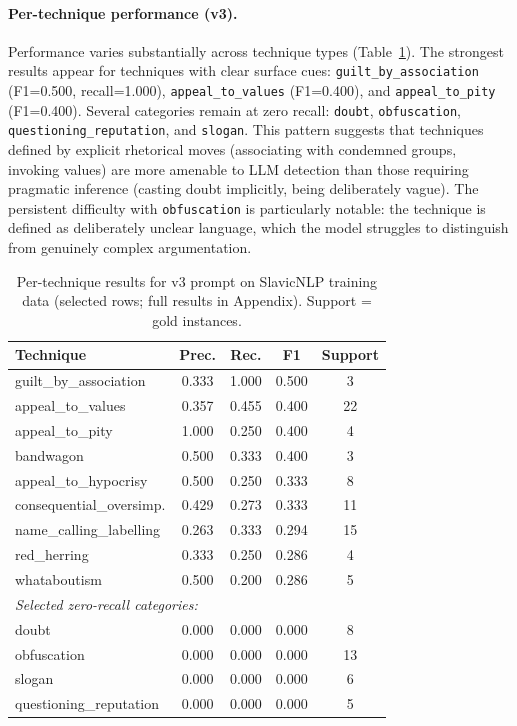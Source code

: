 \documentclass[10pt, a4paper]{article}
\begin{document}
\paragraph{Per-technique performance (v3).}
Performance varies substantially across technique types (Table~\ref{tab:per_technique}). The strongest results appear for techniques with clear surface cues: \texttt{guilt\_by\_association} (F1=0.500, recall=1.000), \texttt{appeal\_to\_values} (F1=0.400), and \texttt{appeal\_to\_pity} (F1=0.400). Several categories remain at zero recall: \texttt{doubt}, \texttt{obfuscation}, \texttt{questioning\_reputation}, and \texttt{slogan}. This pattern suggests that techniques defined by explicit rhetorical moves (associating with condemned groups, invoking values) are more amenable to LLM detection than those requiring pragmatic inference (casting doubt implicitly, being deliberately vague). The persistent difficulty with \texttt{obfuscation} is particularly notable: the technique is defined as deliberately unclear language, which the model struggles to distinguish from genuinely complex argumentation.

\begin{table}[h]
\centering
\small
\begin{tabular}{lcccc}
  \hline
  \textbf{Technique} & \textbf{Prec.} & \textbf{Rec.} & \textbf{F1} & \textbf{Support} \\
  \hline
  guilt\_by\_association & 0.333 & 1.000 & 0.500 & 3 \\
  appeal\_to\_values & 0.357 & 0.455 & 0.400 & 22 \\
  appeal\_to\_pity & 1.000 & 0.250 & 0.400 & 4 \\
  bandwagon & 0.500 & 0.333 & 0.400 & 3 \\
  appeal\_to\_hypocrisy & 0.500 & 0.250 & 0.333 & 8 \\
  consequential\_oversimp. & 0.429 & 0.273 & 0.333 & 11 \\
  name\_calling\_labelling & 0.263 & 0.333 & 0.294 & 15 \\
  red\_herring & 0.333 & 0.250 & 0.286 & 4 \\
  whataboutism & 0.500 & 0.200 & 0.286 & 5 \\
  \hline
  \multicolumn{5}{l}{\textit{Selected zero-recall categories:}} \\
  doubt & 0.000 & 0.000 & 0.000 & 8 \\
  obfuscation & 0.000 & 0.000 & 0.000 & 13 \\
  slogan & 0.000 & 0.000 & 0.000 & 6 \\
  questioning\_reputation & 0.000 & 0.000 & 0.000 & 5 \\
  \hline
\end{tabular}
\caption{Per-technique results for v3 prompt on SlavicNLP training data (selected rows; full results in Appendix). Support = gold instances.}
\label{tab:per_technique}
\end{table}
\end{document}
